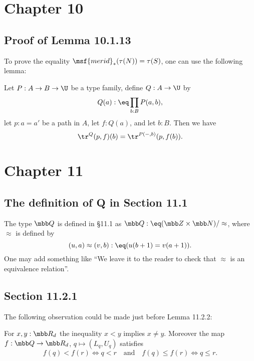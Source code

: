 \documentclass[12pt]{article}
\begin{document}

\section{Chapter 10}

\subsection{Proof of Lemma 10.1.13}

To prove the equality $\msf{merid}_*(\tau(N))=\tau(S)$, one can use the following lemma:

Let $P:A\to B\to\U$ be a type family, define $Q:A\to\U$ by $$Q(a):\eq\prod_{b:B}P(a,b),$$ let $p:a=a'$ be a path in $A$, let $f:Q(a)$, and let $b:B$. Then we have 
$$
\tr^Q(p,f)(b)=\tr^{P(-,b)}(p,f(b)).
$$


\section{Chapter 11}

\subsection{The definition of Q in Section 11.1}

The type $\mbb Q$ is defined in \S11.1 as $\mbb Q:\eq(\mbb Z\times\mbb N)/\approx$, where $\approx$ is defined by 
$$
(u,a)\approx(v,b):\eq(u(b+1)=v(a+1)).
$$ 
One may add something like ``We leave it to the reader to check that $\approx$ is an equivalence relation''.


\subsection{Section 11.2.1}

The following observation could be made just before Lemma 11.2.2: 

For $x,y:\mbb R_d$ the inequality $x<y$ implies $x\neq y$. Moreover the map $f:\mbb Q\to\mbb R_d$, $q\mapsto(L_q,U_q)$ satisfies
$$
f(q)<f(r)\iff q<r\quad\text{and}\quad f(q)\le f(r)\iff q\le r.
$$ 


\end{document}
